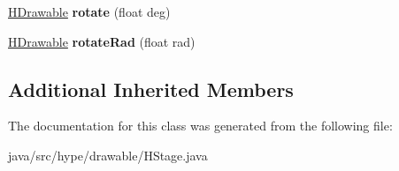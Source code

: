 \begin{DoxyCompactItemize}
\item 
\hypertarget{classhype_1_1drawable_1_1_h_stage_a9f9b1b42692ba75442c3c77a02ae54bf}{\hyperlink{classhype_1_1drawable_1_1_h_drawable}{H\-Drawable} {\bfseries rotate} (float deg)}\label{classhype_1_1drawable_1_1_h_stage_a9f9b1b42692ba75442c3c77a02ae54bf}

\item 
\hypertarget{classhype_1_1drawable_1_1_h_stage_a376cc1a9c6d4700d9e8f2cf73dd34bb6}{\hyperlink{classhype_1_1drawable_1_1_h_drawable}{H\-Drawable} {\bfseries rotate\-Rad} (float rad)}\label{classhype_1_1drawable_1_1_h_stage_a376cc1a9c6d4700d9e8f2cf73dd34bb6}

\end{DoxyCompactItemize}
\subsection*{Additional Inherited Members}


The documentation for this class was generated from the following file\-:\begin{DoxyCompactItemize}
\item 
java/src/hype/drawable/H\-Stage.\-java\end{DoxyCompactItemize}
